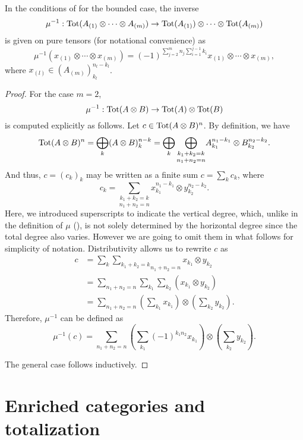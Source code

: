 \documentclass[Thesis.tex]{subfiles}
\begin{document}
\begin{lem}\label{mui}
In the conditions of  for the bounded case, the inverse
\[\mu^{-1}:\operatorname{Tot}(A_{(1)}\otimes\cdots\otimes A_{(m)})\to \operatorname{Tot}(A_{(1)})\otimes\cdots\otimes \operatorname{Tot}(A_{(m)})\]
is given on pure tensors (for notational convenience) as
\begin{equation}\label{mu}
\mu^{-1}(x_{(1)}\otimes\cdots\otimes x_{(m)})=(-1)^{\sum_{j=2}^m n_j\sum_{i=1}^{j-1}k_i}x_{(1)}\otimes\cdots\otimes x_{(m)},
\end{equation}
where $x_{(l)}\in (A_{(m)})_{k_l}^{n_l-k_l}$.
\end{lem}
\begin{proof}
For the case $m=2$,
\[\mu^{-1}:\operatorname{Tot}(A\otimes B)\to \operatorname{Tot}(A)\otimes \operatorname{Tot}(B)\]
is computed explicitly as follows.
Let  $c\in\operatorname{Tot}(A\otimes B)^n$. By definition, we have
\[\operatorname{Tot}(A\otimes B)^n=\bigoplus_k (A\otimes B)^{n-k}_k=\bigoplus_k\underset{n_1+n_2=n}{\bigoplus_{k_1+k_2=k}}A_{k_1}^{n_1-k_1}\otimes B_{k_2}^{n_2-k_2}.\]
And thus, $c=(c_k)_k$ may be written as a finite sum $c=\sum_k c_k$, where 
\[c_k=\underset{n_1+n_2=n}{\sum_{k_1+k_2=k}}x_{k_1}^{n_1-k_1}\otimes y_{k_2}^{n_2-k_2}.\]
Here, we introduced superscripts to indicate the vertical degree, which, unlike in the definition of $\mu$ (), is not solely determined by the horizontal degree since the total degree also varies. However we are going to omit them in what follows for simplicity of notation. Distributivity allows us to rewrite $c$ as
\begin{align*}
c&=\sum_k \underset{n_1+n_2=n}{\sum_{k_1+k_2=k}}x_{k_1}\otimes y_{k_2}\\&=\sum_{n_1+n_2=n}\sum_{k_1}\sum_{k_2}(x_{k_1}\otimes y_{k_2})\\
&=\sum_{n_1+n_2=n}\left(\sum_{k_1}x_{k_1}\right)\otimes\left(\sum_{k_2}y_{k_2}\right).
\end{align*}
Therefore, $\mu^{-1}$ can be defined as
\[\mu^{-1}(c)=\sum_{n_1+n_2=n}\left(\sum_{k_1}(-1)^{k_1n_2}x_{k_1}\right)\otimes\left(\sum_{k_2}y_{k_2}\right).\]

The general case follows inductively.
\end{proof}
\pagebreak
\section{Enriched categories and totalization}
\end{document}
